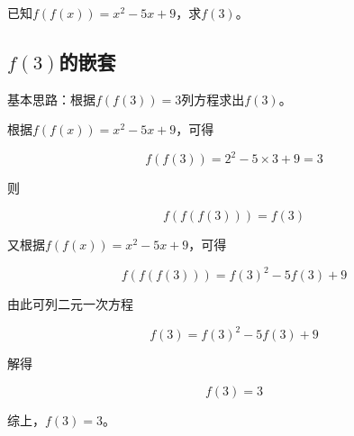 

已知$f(f(x)) = x^2 - 5x + 9$，求$f(3)$。


\subsection{$f(3)$的嵌套}

基本思路：根据$f(f(3)) = 3$列方程求出$f(3)$。

根据$f(f(x)) = x^2 - 5x + 9$，可得

\[ f(f(3)) = 2^2 - 5\times3 + 9 = 3 \]

则

\[ f(f(f(3))) = f(3) \]

又根据$f(f(x)) = x^2 - 5x + 9$，可得

\[ f(f(f(3))) = f(3)^2 - 5f(3) + 9 \]

由此可列二元一次方程

\[ f(3) = f(3)^2 - 5f(3) + 9 \]

解得

\[ f(3) = 3 \]

综上，$f(3) = 3$。
